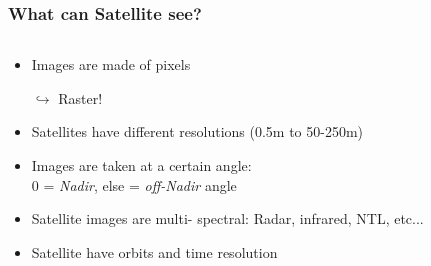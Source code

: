 \documentclass[xcolor=x11names,aspectratio=169, compress]{beamer}
\renewcommand{\(}{\begin{columns}}
\renewcommand{\)}{\end{columns}}
\newcommand{\<}[1]{\begin{column}{#1}}
\renewcommand{\>}{\end{column}}
\begin{document}
\begin{frame}
    \frametitle{What can  Satellite see? }
    \begin{columns}[T]
        \begin{column}{0.7\textwidth}
            \begin{itemize}[<+->]
             \item Images are made of pixels
             \item[$\hookrightarrow$] Raster!
             \item Satellites have different resolutions (0.5m to  50-250m)
             \item Images are taken at a certain angle:\\ 0 = \emph{Nadir}, else = \emph{off-Nadir} angle
             \item Satellite images are multi- spectral: Radar, infrared, NTL, etc...
             \item Satellite have orbits and time resolution
            \end{itemize}
        \end{column}
        \begin{column}{0.3\textwidth}
         \begin{itemize}
             \item[]

\end{itemize}
\end{column}
\end{columns}
\end{frame}
\end{document}
